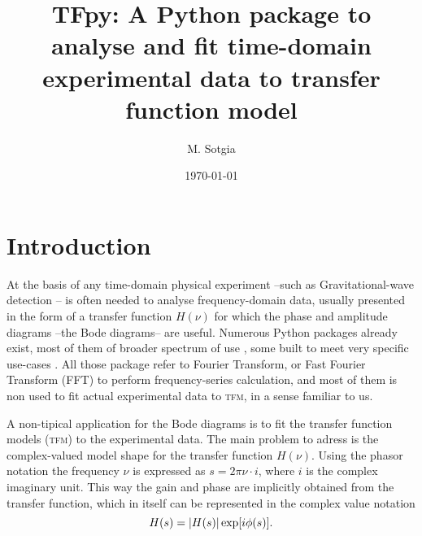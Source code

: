 \documentclass[a4paper,reprint,preprintnumbers,showkeys]{revtex4-2}
\newcommand\tfm{{\scshape tfm}}
\newcommand\tfpy{TFpy}
\begin{document}
\title{\tfpy: A Python package to analyse and fit time-domain experimental data to transfer function model}
\author{M. Sotgia}
\date{\today}
\preprint{\tfpy-PREPRINT}
\maketitle

\section{Introduction}

At the basis of any time-domain physical experiment --such as Gravitational-wave detection -- is often needed to analyse frequency-domain data, usually presented in the form of a transfer function $H(\nu)$ for which the phase and amplitude diagrams --the Bode diagrams-- are useful. Numerous Python packages already exist, most of them of broader spectrum of use \cite[]{2020SciPy-NMeth,pythoncontrol}, some built to meet very specific use-cases \cite[]{gwpy,kontrol}. All those package refer to Fourier Transform, or Fast Fourier Transform ({\scshape FFT}) to perform frequency-series calculation, and most of them is non used to fit actual experimental data to \tfm, in a sense familiar to us. 

A non-tipical application for the Bode diagrams is to fit the transfer function models (\tfm) to the experimental data. The main problem to adress is the complex-valued model shape for the transfer function $H(\nu)$. Using the phasor notation the frequency $\nu$ is expressed as $s=2\pi\nu\cdot i$, where $i$ is the complex imaginary unit. This way the gain and phase are implicitly obtained from the transfer function, which in itself can be represented in the complex value notation \[H(s) = \abs{H(s)}\exp[i\phi(s)].\]


\end{document}
